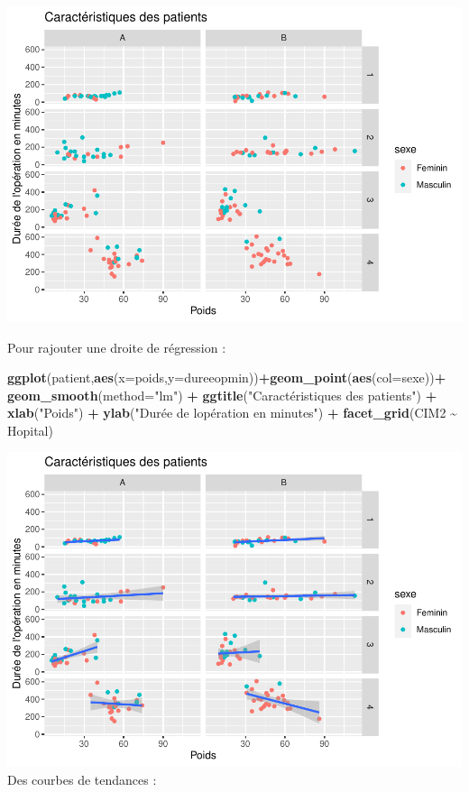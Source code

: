 \documentclass[
]{book}
\newenvironment{Shaded}{\begin{snugshade}}{\end{snugshade}}
\newcommand{\AttributeTok}[1]{\textcolor[rgb]{0.13,0.29,0.53}{#1}}
\newcommand{\FunctionTok}[1]{\textcolor[rgb]{0.13,0.29,0.53}{\textbf{#1}}}
\newcommand{\NormalTok}[1]{#1}
\newcommand{\SpecialCharTok}[1]{\textcolor[rgb]{0.81,0.36,0.00}{\textbf{#1}}}
\newcommand{\StringTok}[1]{\textcolor[rgb]{0.31,0.60,0.02}{#1}}
\begin{document}
\includegraphics{_main_files/figure-latex/ggplot16-1.pdf}

Pour rajouter une droite de régression :

\begin{Shaded}
\begin{Highlighting}[]
\FunctionTok{ggplot}\NormalTok{(patient,}\FunctionTok{aes}\NormalTok{(}\AttributeTok{x=}\NormalTok{poids,}\AttributeTok{y=}\NormalTok{dureeopmin))}\SpecialCharTok{+}\FunctionTok{geom\_point}\NormalTok{(}\FunctionTok{aes}\NormalTok{(}\AttributeTok{col=}\NormalTok{sexe))}\SpecialCharTok{+}
  \FunctionTok{geom\_smooth}\NormalTok{(}\AttributeTok{method=}\StringTok{"lm"}\NormalTok{) }\SpecialCharTok{+}
  \FunctionTok{ggtitle}\NormalTok{(}\StringTok{"Caractéristiques des patients"}\NormalTok{) }\SpecialCharTok{+} 
  \FunctionTok{xlab}\NormalTok{(}\StringTok{"Poids"}\NormalTok{) }\SpecialCharTok{+} 
  \FunctionTok{ylab}\NormalTok{(}\StringTok{"Durée de l\textquotesingle{}opération en minutes"}\NormalTok{) }\SpecialCharTok{+}
  \FunctionTok{facet\_grid}\NormalTok{(CIM2 }\SpecialCharTok{\textasciitilde{}}\NormalTok{ Hopital)}
\end{Highlighting}
\end{Shaded}

\includegraphics{_main_files/figure-latex/ggplot17a-1.pdf}
Des courbes de tendances :
\end{document}
